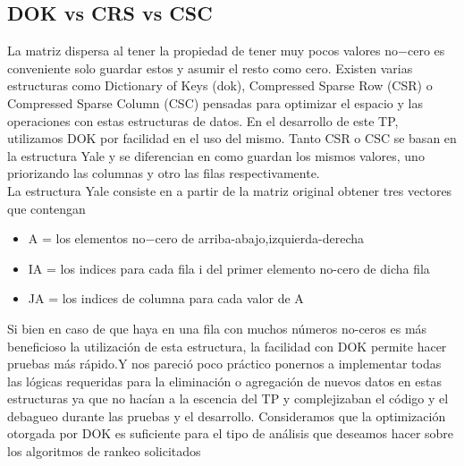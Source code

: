 \subsection{DOK vs CRS vs CSC}
    La matriz dispersa al tener la propiedad de tener muy pocos valores no$-$cero es conveniente solo guardar estos y asumir el resto como cero. Existen varias estructuras como Dictionary of Keys (dok), Compressed Sparse Row (CSR) o Compressed Sparse Column (CSC) pensadas para optimizar el espacio y las operaciones con estas estructuras de datos. En el desarrollo de este TP, utilizamos DOK por facilidad en el uso del mismo. Tanto CSR o CSC se basan en la estructura Yale y se diferencian en como guardan los mismos valores, uno priorizando las columnas y otro las filas respectivamente.\\
    La estructura Yale consiste en a partir de la matriz original obtener tres vectores que contengan 
    \begin{itemize}
        \item A = los elementos no$-$cero de arriba-abajo,izquierda-derecha
        \item IA = los indices para cada fila i del primer elemento no-cero de dicha fila
        \item JA = los indices de columna para cada valor de A
    \end{itemize}
    Si bien en caso de que haya en una fila con muchos números no-ceros es más beneficioso la utilización de esta estructura, la facilidad con DOK permite hacer pruebas más rápido.Y nos pareció poco práctico ponernos a implementar todas las lógicas requeridas para la eliminación o agregación de nuevos datos en estas estructuras ya que no hacían a la escencia del TP y complejizaban el código y el debagueo durante las pruebas y el desarrollo. Consideramos que la optimización otorgada por DOK es suficiente para el tipo de análisis que deseamos hacer sobre los algoritmos de rankeo solicitados



